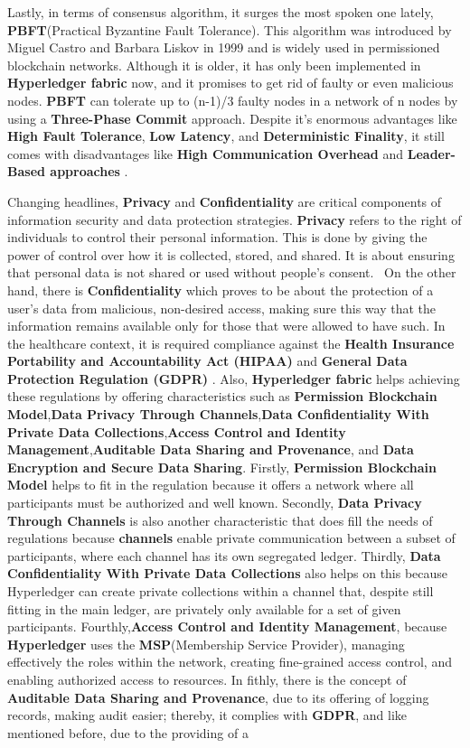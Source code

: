 Lastly, in terms of consensus algorithm, it surges the most spoken one lately, \textbf{PBFT}(Practical Byzantine Fault Tolerance). This algorithm was introduced by Miguel Castro and Barbara Liskov in 1999 and is widely used in permissioned blockchain networks. Although it is older, it has only been implemented in \textbf{Hyperledger fabric} now, and it promises to get rid of faulty or even malicious nodes. \textbf{PBFT} can tolerate up to (n-1)/3 faulty nodes in a network of n nodes by using a \textbf{Three-Phase Commit} approach. Despite it's enormous advantages like \textbf{High Fault Tolerance}, \textbf{Low Latency}, and \textbf{Deterministic Finality}, it still comes with disadvantages like \textbf{High Communication Overhead} and \textbf{Leader-Based approaches} \cite{pbft}.

Changing headlines, \textbf{Privacy} and \textbf{Confidentiality} are critical components of information security and data protection strategies. \textbf{Privacy} refers to the right of individuals to control their personal information. This is done by giving the power of control over how it is collected, stored, and shared. It is about ensuring that personal data is not shared or used without people's consent.  On the other hand, there is \textbf{Confidentiality} which proves to be about the protection of a user's data from malicious, non-desired access, making sure this way that the information remains available only for those that were allowed to have such. In the healthcare context, it is required compliance against the \textbf{Health Insurance Portability and Accountability Act (HIPAA)} and \textbf{General Data Protection Regulation (GDPR)} \cite{hipaa} \cite{gdpr}. Also, \textbf{Hyperledger fabric} helps achieving these regulations by offering characteristics such as \textbf{Permission Blockchain Model},\textbf{Data Privacy Through Channels},\textbf{Data Confidentiality With Private Data Collections},\textbf{Access Control and Identity Management},\textbf{Auditable Data Sharing and Provenance}, and \textbf{Data Encryption and Secure Data Sharing}. Firstly, \textbf{Permission Blockchain Model} helps to fit in the regulation because it offers a network where all participants must be authorized and well known. Secondly, \textbf{Data Privacy Through Channels} is also another characteristic that does fill the needs of regulations because \textbf{channels} enable private communication between a subset of participants, where each channel has its own segregated ledger. Thirdly, \textbf{Data Confidentiality With Private Data Collections} also helps on this because Hyperledger can create private collections within a channel that, despite still fitting in the main ledger, are privately only available for a set of given participants. Fourthly,\textbf{Access Control and Identity Management}, because \textbf{Hyperledger} uses the \textbf{MSP}(Membership Service Provider), managing effectively the roles within the network, creating fine-grained access control, and enabling authorized access to resources. In fithly, there is the concept of \textbf{Auditable Data Sharing and Provenance}, due to its offering of logging records, making audit easier; thereby, it complies with \textbf{GDPR}, and like mentioned before, due to the providing of a 
